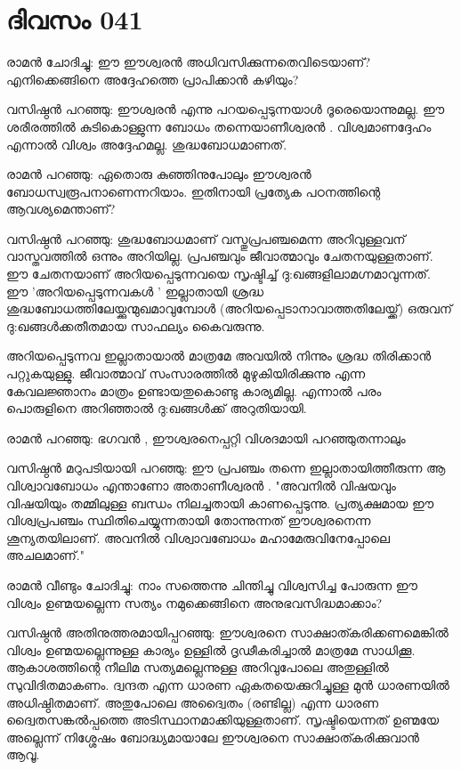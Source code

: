 \newpage
\section{ദിവസം 041}


രാമന്‍ ചോദിച്ചു: ഈ ഈശ്വരന്‍ അധിവസിക്കുന്നതെവിടെയാണ്‌? എനിക്കെങ്ങിനെ അദ്ദേഹത്തെ പ്രാപിക്കാന്‍ കഴിയും?

വസിഷ്ഠന്‍ പറഞ്ഞു: ഈശ്വരന്‍ എന്നു പറയപ്പെടുന്നയാള്‍ ദൂരെയൊന്നുമല്ല. ഈ ശരീരത്തില്‍ കുടികൊള്ളുന്ന ബോധം തന്നെയാണീശ്വരന്‍ . വിശ്വമാണദ്ദേഹം എന്നാല്‍ വിശ്വം അദ്ദേഹമല്ല. ശുദ്ധബോധമാണത്‌. 

രാമന്‍ പറഞ്ഞു: ഏതൊരു കുഞ്ഞിനുപോലും ഈശ്വരന്‍ ബോധസ്വരൂപനാണെന്നറിയാം. ഇതിനായി പ്രത്യേക പഠനത്തിന്റെ ആവശ്യമെന്താണ്‌?

വസിഷ്ഠന്‍ പറഞ്ഞു: ശുദ്ധബോധമാണ്‌ വസ്തുപ്രപഞ്ചമെന്ന അറിവുള്ളവന്‌ വാസ്തവത്തില്‍ ഒന്നും അറിയില്ല. പ്രപഞ്ചവും ജീവാത്മാവും ചേതനയുള്ളതാണ്‌. ഈ ചേതനയാണ്‌ അറിയപ്പെടുന്നവയെ സൃഷ്ടിച്ച്‌ ദു:ഖങ്ങളിലാമഗ്നമാവുന്നത്‌. ഈ 'അറിയപ്പെടുന്നവകള്‍ ' ഇല്ലാതായി ശ്രദ്ധ ശുദ്ധബോധത്തിലേയ്ക്കുന്മുഖമാവുമ്പോള്‍ (അറിയപ്പെടാനാവാത്തതിലേയ്ക്ക്‌) ഒരുവന്‌ ദു:ഖങ്ങള്‍ക്കതീതമായ സാഫല്യം കൈവരുന്നു.

അറിയപ്പെടുന്നവ ഇല്ലാതായാല്‍ മാത്രമേ അവയില്‍ നിന്നും ശ്രദ്ധ തിരിക്കാന്‍ പറ്റുകയുള്ളു. ജീവാത്മാവ്‌ സംസാരത്തില്‍ മുഴുകിയിരിക്കുന്നു എന്ന കേവലജ്ഞാനം മാത്രം ഉണ്ടായതുകൊണ്ടു കാര്യമില്ല. എന്നാല്‍ പരം പൊരുളിനെ അറിഞ്ഞാല്‍ ദു:ഖങ്ങള്‍ക്ക്‌ അറുതിയായി. 

രാമന്‍ പറഞ്ഞു: ഭഗവന്‍ , ഈശ്വരനെപ്പറ്റി വിശദമായി പറഞ്ഞുതന്നാലും

വസിഷ്ഠന്‍ മറുപടിയായി പറഞ്ഞു: ഈ പ്രപഞ്ചം തന്നെ ഇല്ലാതായിത്തീരുന്ന ആ വിശ്വാവബോധം എന്താണോ അതാണീശ്വരന്‍ . "അവനില്‍ വിഷയവും വിഷയിയും തമ്മിലുള്ള ബന്ധം നിലച്ചതായി കാണപ്പെടുന്നു. പ്രത്യക്ഷമായ ഈ വിശ്വപ്രപഞ്ചം സ്ഥിതിചെയ്യുന്നതായി തോന്നുന്നത്‌ ഈശ്വരനെന്ന ശൂന്യതയിലാണ്‌. അവനില്‍ വിശ്വാവബോധം മഹാമേരുവിനേപ്പോലെ അചലമാണ്‌."

രാമന്‍ വീണ്ടും ചോദിച്ചു: നാം സത്തെന്നു ചിന്തിച്ചു വിശ്വസിച്ച പോരുന്ന ഈ വിശ്വം ഉണ്മയല്ലെന്ന സത്യം നമുക്കെങ്ങിനെ അനുഭവസിദ്ധമാക്കാം?

വസിഷ്ഠന്‍ അതിനുത്തരമായിപ്പറഞ്ഞു: ഈശ്വരനെ സാക്ഷാത്കരിക്കണമെങ്കില്‍ വിശ്വം ഉണ്മയല്ലെന്നുള്ള കാര്യം ഉള്ളില്‍ ദൃഢീകരിച്ചാല്‍ മാത്രമേ സാധിക്കൂ. ആകാശത്തിന്റെ നീലിമ സത്യമല്ലെന്നുള്ള അറിവുപോലെ അതുള്ളില്‍ സുവിദിതമാകണം. ദ്വന്ദത എന്ന ധാരണ ഏകതയെക്കുറിച്ചുള്ള മുന്‍ ധാരണയില്‍ അധിഷ്ഠിതമാണ്‌. അതുപോലെ അദ്വൈതം (രണ്ടില്ല) എന്ന ധാരണ ദ്വൈതസങ്കല്‍പ്പത്തെ അടിസ്ഥാനമാക്കിയുള്ളതാണ്‌. സൃഷ്ടിയെന്നത്‌ ഉണ്മയേ അല്ലെന്ന് നിശ്ശേഷം ബോദ്ധ്യമായാലേ ഈശ്വരനെ സാക്ഷാത്കരിക്കുവാന്‍ ആവൂ.
